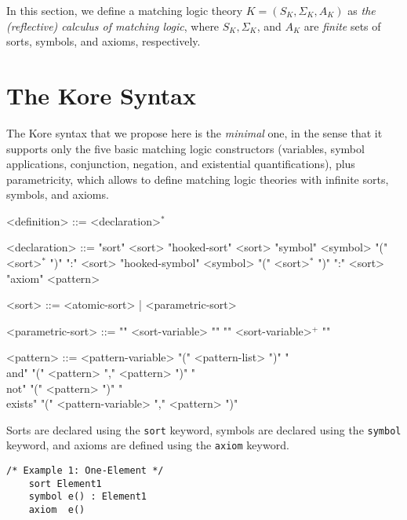 \documentclass[UTF8,11pt]{article}
\theoremstyle{plain}
\theoremstyle{definition}
\theoremstyle{remark}
\begin{document}
In this section, we define a matching logic theory $K = (S_K, \Sigma_K, A_K)$ 
as \emph{the (reflective) calculus of matching logic},
where $S_K, \Sigma_K$, and $A_K$ are \emph{finite} sets of sorts,
symbols, and axioms,  respectively.



\section{The Kore Syntax}

The Kore syntax that we propose here is the \emph{minimal} one, in the sense that it supports only the five basic matching logic constructors (variables, symbol applications, conjunction, negation, and existential quantifications), plus parametricity, which allows to define matching logic theories with infinite sorts, symbols, and axioms.

\begin{grammar}\small
	<definition>    ::= <declaration>$^*$
	
	<declaration>   ::= "sort" <sort>
	\alt "hooked-sort" <sort>
	\alt "symbol" <symbol> "(" <sort>$^*$ ")" ":" <sort>
	\alt "hooked-symbol" <symbol> "(" <sort>$^*$ ")" ":" <sort>
	\alt "axiom" <pattern>
	
	<sort>          ::= <atomic-sort> | <parametric-sort>
	
	<parametric-sort> ::= "{" <sort-variable> "}"
	\alt <sort-constructor> "{" <sort-variable>$^+$ "}"
	
	<pattern> ::= <pattern-variable>
	\alt <symbol-id> "(" <pattern-list> ")"
	\alt "\\and" "(" <pattern> "," <pattern> ")"
	\alt "\\not" "(" <pattern> ")" 
	\alt "\\exists" "(" <pattern-variable> "," <pattern> ")"
\end{grammar}

\newcommand{\smalltt}[1]{\texttt{\small #1} }
\newcommand{\sort}{\smalltt{sort}}
\newcommand{\symb}{\smalltt{symbol}}
\newcommand{\axiom}{\smalltt{axiom}}


Sorts are declared using the \sort keyword, symbols are declared using the \symb keyword, and axioms are defined using the \axiom keyword.

\begin{Verbatim}[fontsize=\small]
    /* Example 1: One-Element */
    sort Element1
    symbol e() : Element1
    axiom  e()
\end{Verbatim}
\end{document}
